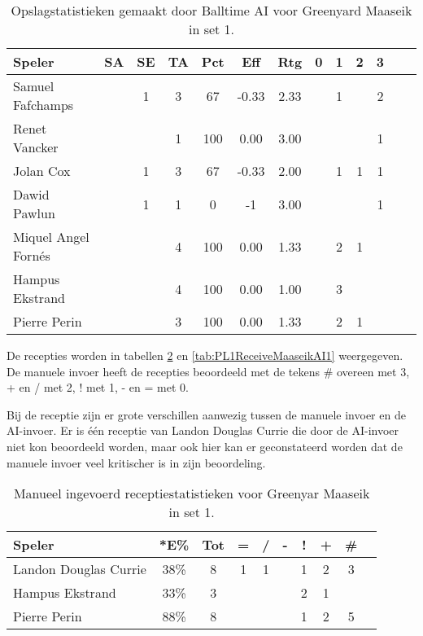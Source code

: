 \begin{table}[ht!]
  \centering
  \scriptsize
  \begin{tabular}{|l|c|c|c|c|c|c|c|c|c|c|c|c|} \hline
    \textbf{Speler} & SA & SE & TA & Pct & Eff & Rtg & 0 & 1 & 2 & 3 \\ \hline
    Samuel Fafchamps &  & 1 & 3 & 67 & -0.33 & 2.33 &  & 1 &  & 2  \\
    Renet Vancker &  &  & 1 & 100 & 0.00 & 3.00 &  &  &  & 1  \\
    Jolan Cox &  & 1 & 3 & 67 & -0.33 & 2.00 &  & 1 & 1 & 1 \\
    Dawid Pawlun &  & 1 & 1 & 0 & -1 & 3.00 &  &  &  & 1 \\
    Miquel Angel Fornés &  &  & 4 & 100 & 0.00 & 1.33 &  & 2 & 1 & \\
    Hampus Ekstrand &  &  & 4 & 100 & 0.00 & 1.00 &  & 3 &  & \\
    Pierre Perin &  &  & 3 & 100 & 0.00 & 1.33 &  & 2 & 1 & \\ \hline
  \end{tabular}
  \caption[Opslagstatistieken gemaakt door Balltime AI voor Greenyard Maaseik in set 1]{\label{tab:PL1ServeMaaseikAI1}Opslagstatistieken gemaakt door Balltime AI voor Greenyard Maaseik in set 1.}
\end{table}

De recepties worden in tabellen \ref{tab:PL1ReceiveMaaseikMan1} en \ref{tab:PL1ReceiveMaaseikAI1} weergegeven. De manuele invoer heeft de recepties beoordeeld met de tekens \# overeen met 3, + en / met 2, ! met 1, - en = met 0.

Bij de receptie zijn er grote verschillen aanwezig tussen de manuele invoer en de AI-invoer. Er is één receptie van Landon Douglas Currie die door de AI-invoer niet kon beoordeeld worden, maar ook hier kan er geconstateerd worden dat de manuele invoer veel kritischer is in zijn beoordeling. 

\begin{table}[ht!]
    \centering
    \scriptsize
    \begin{tabular}{|l|c|c|c|c|c|c|c|c|c|} \hline
        \textbf{Speler} & *E\% & Tot & = & / & - & ! & + & \# \\ \hline
        Landon Douglas Currie & 38\% & 8 & 1 & 1 &  & 1 & 2 & 3 \\ 
        Hampus Ekstrand & 33\% & 3 &  &  &  & 2 & 1 &  \\ 
        Pierre Perin & 88\% & 8 &  &  &  & 1 & 2 & 5  \\ \hline
    \end{tabular}
    \caption[Manueel ingevoerde receptiestatistieken voor Greenyard Maaseik in set 1]{\label{tab:PL1ReceiveMaaseikMan1}Manueel ingevoerd receptiestatistieken voor Greenyar Maaseik in set 1.}
\end{table}

